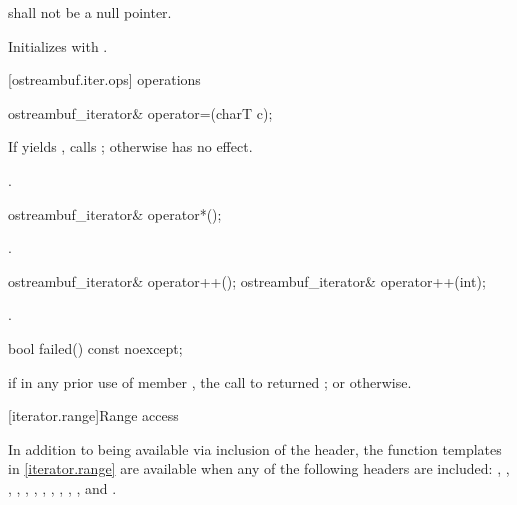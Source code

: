 \begin{itemdescr}
\pnum
\requires
{}
shall not be a null pointer.

\pnum
\effects
Initializes  with .
\end{itemdescr}

[ostreambuf.iter.ops]{ operations}

%
\begin{itemdecl}
ostreambuf_iterator& operator=(charT c);
\end{itemdecl}

\begin{itemdescr}
\pnum
\effects
If
yields
,
calls
;
otherwise has no effect.

\pnum
\returns
{}.
\end{itemdescr}

%
\begin{itemdecl}
ostreambuf_iterator& operator*();
\end{itemdecl}

\begin{itemdescr}
\pnum
\returns
{}.
\end{itemdescr}

%
\begin{itemdecl}
ostreambuf_iterator& operator++();
ostreambuf_iterator& operator++(int);
\end{itemdecl}

\begin{itemdescr}
\pnum
\returns
{}.
\end{itemdescr}

%
\begin{itemdecl}
bool failed() const noexcept;
\end{itemdecl}

\begin{itemdescr}
\pnum
\returns
{}
if in any prior use of member
,
the call to
returned
;
or
otherwise.
\end{itemdescr}

[iterator.range]{Range access}

\pnum
In addition to being available via inclusion of the  header,
the function templates in \ref{iterator.range} are available when any of the following
headers are included: , , ,
, , , , ,
, , , and .

